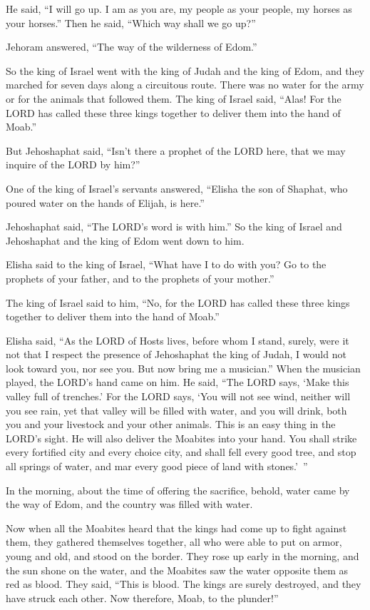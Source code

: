 He said, “I will go up. I am as you are, my people as your people, my horses as your horses.”
\myverse{}Then he said, “Which way shall we go up?”

Jehoram answered, “The way of the wilderness of Edom.”

\myverse{}So the king of Israel went with the king of Judah and the king
of Edom, and they marched for seven days along a circuitous route. There was no water for the army or
for the animals that followed them.
\myverse{}The king of Israel said, “Alas! For the LORD has called these three kings
together to deliver them into the hand of Moab.”

\myverse{}But Jehoshaphat said, “Isn’t there a prophet of the LORD here,
that we may inquire of the LORD by him?”

One of the king of Israel’s servants answered, “Elisha the son of Shaphat, who poured water
on the hands of Elijah, is here.”

\myverse{}Jehoshaphat said, “The LORD’s word is with him.” So the king
of Israel and Jehoshaphat and the king of Edom went down to him.

\myverse{}Elisha said to the king of Israel, “What have I to do with you?
Go to the prophets of your father, and to the prophets of your mother.”

The king of Israel said to him, “No, for the LORD has called these three kings together to
deliver them into the hand of Moab.”

\myverse{}Elisha said, “As the LORD of Hosts lives, before whom I stand,
surely, were it not that I respect the presence of Jehoshaphat the king of Judah, I would not look toward
you, nor see you.
\myverse{}But now bring me a musician.” When the musician played, the LORD’s hand came
on him.
\myverse{}He said, “The LORD says, ‘Make this valley full of trenches.’
\myverse{}For the LORD says, ‘You will not see wind, neither will you see rain, yet
that valley will be filled with water, and you will drink, both you and your livestock and your other
animals.
\myverse{}This is an easy thing in the LORD’s sight. He will also deliver the Moabites
into your hand.
\myverse{}You shall strike every fortified city and every choice city, and shall fell
every good tree, and stop all springs of water, and mar every good piece of land with stones.’ ”

\myverse{}In the morning, about the time of offering the sacrifice, behold,
water came by the way of Edom, and the country was filled with water.

\myverse{}Now when all the Moabites heard that the kings had come up to
fight against them, they gathered themselves together, all who were able to put on armor, young and old,
and stood on the border.
\myverse{}They rose up early in the morning, and the sun shone on the water, and the
Moabites saw the water opposite them as red as blood.
\myverse{}They said, “This is blood. The kings are surely destroyed, and they have struck
each other. Now therefore, Moab, to the plunder!”

